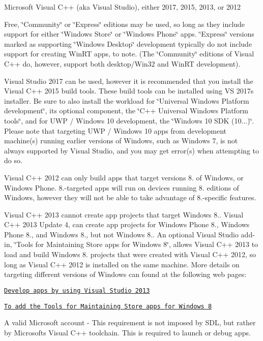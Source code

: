 \begin{DoxyItemize}
\item Microsoft Visual C++ (aka Visual Studio), either 2017, 2015, 2013, or 2012
\begin{DoxyItemize}
\item Free, \char`\"{}\+Community\char`\"{} or \char`\"{}\+Express\char`\"{} editions may be used, so long as they include support for either \char`\"{}\+Windows Store\char`\"{} or \char`\"{}\+Windows Phone\char`\"{} apps. \char`\"{}\+Express\char`\"{} versions marked as supporting \char`\"{}\+Windows Desktop\char`\"{} development typically do not include support for creating Win\+RT apps, to note. (The \char`\"{}\+Community\char`\"{} editions of Visual C++ do, however, support both desktop/\+Win32 and Win\+RT development).
\item Visual Studio 2017 can be used, however it is recommended that you install the Visual C++ 2015 build tools. These build tools can be installed using VS 2017\textquotesingle{}s installer. Be sure to also install the workload for \char`\"{}\+Universal Windows Platform development\char`\"{}, its optional component, the \char`\"{}\+C++ Universal Windows Platform tools\char`\"{}, and for U\+WP / Windows 10 development, the \char`\"{}\+Windows 10 S\+D\+K (10...)\char`\"{}. Please note that targeting U\+WP / Windows 10 apps from development machine(s) running earlier versions of Windows, such as Windows 7, is not always supported by Visual Studio, and you may get error(s) when attempting to do so.
\item Visual C++ 2012 can only build apps that target versions 8. of Windows, or Windows Phone. 8.-\/targeted apps will run on devices running 8. editions of Windows, however they will not be able to take advantage of 8.-\/specific features.
\item Visual C++ 2013 cannot create app projects that target Windows 8.. Visual C++ 2013 Update 4, can create app projects for Windows Phone 8., Windows Phone 8., and Windows 8., but not Windows 8.. An optional Visual Studio add-\/in, \char`\"{}\+Tools for Maintaining Store apps for Windows 8\char`\"{}, allows Visual C++ 2013 to load and build Windows 8. projects that were created with Visual C++ 2012, so long as Visual C++ 2012 is installed on the same machine. More details on targeting different versions of Windows can found at the following web pages\+:
\begin{DoxyItemize}
\item \href{http://msdn.microsoft.com/en-us/library/windows/apps/br211384.aspx}{\tt Develop apps by using Visual Studio 2013}
\item \href{http://msdn.microsoft.com/en-us/library/windows/apps/dn263114.aspx#AddMaintenanceTools}{\tt To add the Tools for Maintaining Store apps for Windows 8}
\end{DoxyItemize}
\end{DoxyItemize}
\item A valid Microsoft account -\/ This requirement is not imposed by S\+DL, but rather by Microsoft\textquotesingle{}s Visual C++ toolchain. This is required to launch or debug apps.
\end{DoxyItemize}

